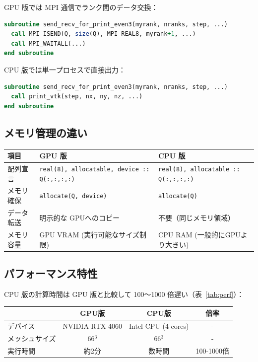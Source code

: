 GPU 版では MPI 通信でランク間のデータ交換：

\begin{lstlisting}[language=Fortran]
subroutine send_recv_for_print_even3(myrank, nranks, step, ...)
  call MPI_ISEND(Q, size(Q), MPI_REAL8, myrank+1, ...)
  call MPI_WAITALL(...)
end subroutine
\end{lstlisting}

CPU 版では単一プロセスで直接出力：

\begin{lstlisting}[language=Fortran]
subroutine send_recv_for_print_even3(myrank, nranks, step, ...)
  call print_vtk(step, nx, ny, nz, ...)
end subroutine
\end{lstlisting}

\subsection{メモリ管理の違い}

\begin{table}[h]
\centering
\begin{tabular}{|l|l|l|}
\hline
\textbf{項目} & \textbf{GPU 版} & \textbf{CPU 版} \\
\hline
配列宣言 & \texttt{real(8), allocatable, device :: Q(:,:,:,:)} & \texttt{real(8), allocatable :: Q(:,:,:,:)} \\
メモリ確保 & \texttt{allocate(Q, device)} & \texttt{allocate(Q)} \\
データ転送 & 明示的な GPUへのコピー & 不要（同じメモリ領域） \\
メモリ容量 & GPU VRAM (実行可能なサイズ制限) & CPU RAM (一般的にGPUより大きい) \\
\hline
\end{tabular}
\end{table}

\subsection{パフォーマンス特性}

CPU 版の計算時間は GPU 版と比較して 100〜1000 倍遅い（表~\ref{tab:perf}）：

\begin{table}[h]
\centering
\begin{tabular}{|l|c|c|c|}
\hline
 & GPU版 & CPU版 & 倍率 \\
\hline
デバイス & NVIDIA RTX 4060 & Intel CPU (4 cores) & - \\
メッシュサイズ & 66$^3$ & 66$^3$ & - \\
実行時間 & 約2分 & 数時間 & 100-1000倍 \\
\hline
\end{tabular}
\end{table}

